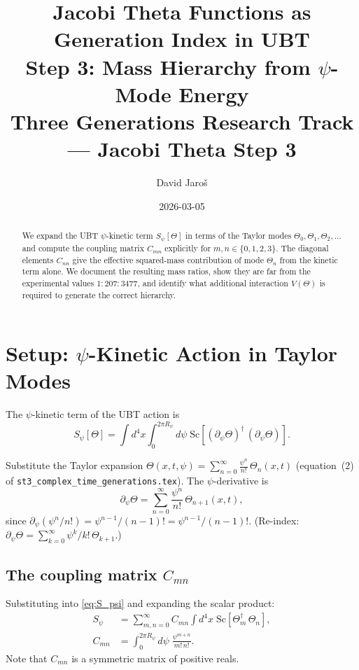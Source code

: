 \documentclass[12pt,a4paper]{article}
\title{%
  Jacobi Theta Functions as Generation Index in UBT\\
  Step 3: Mass Hierarchy from $\psi$-Mode Energy\\
  \large Three Generations Research Track --- Jacobi Theta Step 3
}
\author{David Jaro\v{s}}
\date{2026-03-05}
\theoremstyle{remark}
\newcommand{\Sc}{\mathrm{Sc}}
\begin{document}
\maketitle

\begin{abstract}
We expand the UBT $\psi$-kinetic term $S_\psi[\Theta]$ in terms of the
Taylor modes $\Theta_0, \Theta_1, \Theta_2, \ldots$ and compute the
coupling matrix $C_{mn}$ explicitly for $m,n\in\{0,1,2,3\}$.  The
diagonal elements $C_{nn}$ give the effective squared-mass contribution
of mode $\Theta_n$ from the kinetic term alone.  We document the
resulting mass ratios, show they are far from the experimental values
$1:207:3477$, and identify what additional interaction $V(\Theta)$ is
required to generate the correct hierarchy.
\end{abstract}

\tableofcontents

\section{Setup: $\psi$-Kinetic Action in Taylor Modes}
\label{sec:setup}

The $\psi$-kinetic term of the UBT action is
\begin{equation}
  \label{eq:S_psi}
  S_\psi[\Theta]
  = \int d^4x \int_0^{2\pi R_\psi} d\psi\;
    \Sc\!\left[(\partial_\psi\Theta)^\dagger\,(\partial_\psi\Theta)\right].
\end{equation}

Substitute the Taylor expansion
$\Theta(x,t,\psi) = \sum_{n=0}^\infty \frac{\psi^n}{n!}\,\Theta_n(x,t)$
(equation~(2) of \texttt{st3\_complex\_time\_generations.tex}).  The
$\psi$-derivative is
\begin{equation}
  \partial_\psi\Theta
  = \sum_{n=0}^\infty \frac{\psi^n}{n!}\,\Theta_{n+1}(x,t),
\end{equation}
since $\partial_\psi(\psi^n/n!) = \psi^{n-1}/(n-1)! = \psi^{n-1}/(n-1)!$.
(Re-index: $\partial_\psi\Theta = \sum_{k=0}^\infty\psi^k/k!\,\Theta_{k+1}$.)

\subsection{The coupling matrix $C_{mn}$}

Substituting into \eqref{eq:S_psi} and expanding the scalar product:
\begin{align}
  S_\psi
  &= \sum_{m,n=0}^\infty
     C_{mn}\int d^4x\;
     \Sc\!\left[\Theta_m^\dagger\,\Theta_n\right],
  \label{eq:S_modes}
  \\
  C_{mn}
  &= \int_0^{2\pi R_\psi} d\psi\;
     \frac{\psi^{m+n}}{m!\,n!}.
  \label{eq:Cmn_def}
\end{align}
Note that $C_{mn}$ is a symmetric matrix of positive reals.
\end{document}

